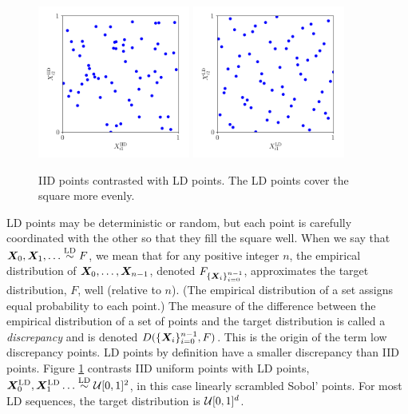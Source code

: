 \documentclass[graybox,footinfo]{svmult}
\newcommand{\LD}{\textup{LD}}
\newcommand{\LDsim}{\overset{\LD}{\sim}}
\begin{document}
\begin{figure}
	\includegraphics[height=5cm]{QMCSoftwareArticle/figs/dd_iid_uniform_pts.png}
	\qquad
	\includegraphics[height=5cm]{QMCSoftwareArticle/figs/dd_sobol_pts.png}
	\caption{IID points contrasted with LD points.  The LD points cover the square more evenly.}
	\label{fig:comparePts}
\end{figure}

LD points may be deterministic or random, but each point is carefully coordinated with the other so that they fill the square well.  When we say that $\bsX_0, \bsX_1, \ldots \LDsim F$, we mean that for any positive integer $n$,  the empirical distribution of ${\boldsymbol{X}}_0, \ldots, {\boldsymbol{X}}_{n-1}$, denoted $F_{\{{\boldsymbol{X}}_i\}_{i=0}^{n-1}}$,  approximates the target distribution, $F$, well (relative to $n$).  (The empirical distribution of a set assigns equal probability to each point.)  The measure of the difference between the empirical distribution of a set of points and the target distribution is called a \emph{discrepancy} and is denoted $D(\{{\boldsymbol{X}}_i\}_{i=0}^{n-1}, F)$.  This is the origin of the term low discrepancy points.  LD points by definition have a smaller discrepancy than IID points.  Figure \ref{fig:comparePts} contrasts IID uniform points with LD points, $\bsX^{\LD}_0, \bsX^{\LD}_1 \ldots \LDsim \calU[0,1]^2$, in this case linearly scrambled Sobol' points. For most LD sequences, the target distribution is ${\mathcal{U}}[0,1]^d$.
\end{document}
